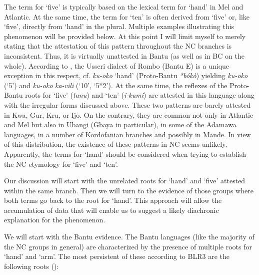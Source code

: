 The term for ‘five’ is typically based on the lexical term for ‘hand’ in Mel and Atlantic. At the same time, the term for ‘ten’ is often derived from ‘five’ or, like ‘five’, directly from ‘hand’ in the plural. Multiple examples illustrating this phenomenon will be provided below. At this point I will limit myself to merely stating that the attestation of this pattern throughout the NC branches is inconsistent. Thus, it is virtually unattested in Bantu (as well as in BC on the whole). According to \citealt{NursePhilippson1975}, the Usseri dialect of Rombo (Bantu E) is a unique exception in this respect, cf. \textit{ku-oko} ‘hand’ (Proto-Bantu \textit{*bókò}) yielding \textit{ku-oko} (‘5’) and \textit{ku-oko} \textit{ka-vili} (‘10’, ‘5*2’). At the same time, the reflexes of the Proto-Bantu roots for ‘five’ (\textit{tanu}) and ‘ten’ (\textit{i-kumi}) are attested in this language along with the irregular forms discussed above. These two patterns are barely attested in Kwa, Gur, Kru, or Ijo. On the contrary, they are common not only in Atlantic and Mel but also in Ubangi (Gbaya in particular), in some of the Adamawa languages, in a number of Kordofanian branches and possibly in Mande. In view of this distribution, the existence of these patterns in NC seems unlikely. Apparently, the terms for ‘hand’ should be considered when trying to establish the NC etymology for ‘five’ and ‘ten’.

Our discussion will start with the unrelated roots for ‘hand’ and ‘five’ attested within the same branch. Then we will turn to the evidence of those groups where both terms go back to the root for ‘hand’. This approach will allow the accumulation of data that will enable us to suggest a likely diachronic explanation for the phenomenon. 

We will start with the Bantu evidence. The Bantu languages (like the majority of the NC groups in general) are characterized by the presence of multiple roots for ‘hand’ and ‘arm’. The most persistent of these according to BLR3 are the following roots ():

